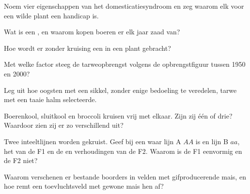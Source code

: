 \begin{exercise}[$\star$]\label{exo:g12:domesticated-plants:2}
Noem vier eigenschappen van het domesticatiesyndroom en zeg waarom elk
voor een wilde plant een handicap is.
\end{exercise}

\begin{exercise}[$\star$]\label{exo:g12:domesticated-plants:3}
Wat is een , en waarom kopen boeren er elk jaar zaad van?
\end{exercise}

\begin{exercise}[$\star$]\label{exo:g12:domesticated-plants:4}
Hoe wordt er zonder kruising een  in een plant gebracht?
\end{exercise}

\begin{exercise}[$\star$]\label{exo:g12:domesticated-plants:5}
Met welke factor steeg de tarweopbrengst volgens de opbrengstfiguur
tussen 1950 en 2000?
\end{exercise}

\begin{exercise}[$\star\star$]\label{exo:g12:domesticated-plants:6}
Leg uit hoe oogsten met een sikkel, zonder enige bedoeling te veredelen,
tarwe met een taaie halm selecteerde.
\end{exercise}

\begin{exercise}[$\star\star$]\label{exo:g12:domesticated-plants:7}
Boerenkool, sluitkool en broccoli kruisen vrij met elkaar. Zijn zij één
 of drie? Waardoor zien zij er zo verschillend uit?
\end{exercise}

\begin{exercise}[$\star\star$]\label{exo:g12:domesticated-plants:8}
Twee inteeltlijnen worden gekruist. Geef bij een  waar lijn A $AA$ is
en lijn B $aa$, het  van de F1 en de  en verhoudingen van
de F2. Waarom is de F1 eenvormig en de F2 niet?
\end{exercise}

\begin{exercise}[$\star\star$]\label{exo:g12:domesticated-plants:9}
Waarom verschenen er bestande boorders in velden met gifproducerende
mais, en hoe remt een toevluchtsveld met gewone mais hen af?
\end{exercise}

